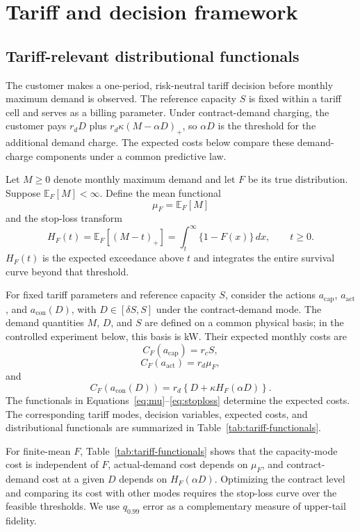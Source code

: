\documentclass[Times1COL]{WileyNJDv5}
\begin{document}
\section{Tariff and decision framework}
\label{sec:tariff-decision-framework}

\subsection{Tariff-relevant distributional functionals}
\label{sec:tariff-functionals}

The customer makes a one-period, risk-neutral tariff decision before monthly maximum demand is observed. The reference capacity $S$ is fixed within a tariff cell and serves as a billing parameter. Under contract-demand charging, the customer pays $r_dD$ plus $r_d\kappa(M-\alpha D)_+$, so $\alpha D$ is the threshold for the additional demand charge. The expected costs below compare these demand-charge components under a common predictive law.

Let $M\geq 0$ denote monthly maximum demand and let $F$ be its true distribution. Suppose $\mathbb{E}_F[M]<\infty$. Define the mean functional
\begin{equation}
\label{eq:mu}
\mu_F=\mathbb{E}_F[M]
\end{equation}
and the stop-loss transform
\begin{equation}
\label{eq:stoploss}
H_F(t)
=
\mathbb{E}_F[(M-t)_+]
=
\int_t^\infty \{1-F(x)\}\,dx,
\qquad t\geq0.
\end{equation}
$H_F(t)$ is the expected exceedance above $t$ and integrates the entire survival curve beyond that threshold.

For fixed tariff parameters and reference capacity $S$, consider the actions $a_{\mathrm{cap}}$, $a_{\mathrm{act}}$, and $a_{\mathrm{con}}(D)$, with $D\in[\delta S,S]$ under the contract-demand mode. The demand quantities $M$, $D$, and $S$ are defined on a common physical basis; in the controlled experiment below, this basis is kW. Their expected monthly costs are
\[
C_F(a_{\mathrm{cap}})=r_cS,
\]
\[
C_F(a_{\mathrm{act}})=r_d\mu_F,
\]
and
\[
C_F\!\left(a_{\mathrm{con}}(D)\right)
=
r_d\left\{D+\kappa H_F(\alpha D)\right\}.
\]
The functionals in Equations~\eqref{eq:mu}--\eqref{eq:stoploss} determine the expected costs. The corresponding tariff modes, decision variables, expected costs, and distributional functionals are summarized in Table~\ref{tab:tariff-functionals}.



For finite-mean $F$, Table~\ref{tab:tariff-functionals} shows that the
capacity-mode cost is independent of $F$, actual-demand cost depends on
$\mu_F$, and contract-demand cost at a given $D$ depends on
$H_F(\alpha D)$. Optimizing the contract level and comparing its cost with other modes
requires the stop-loss curve over the feasible thresholds. We use
$q_{0.99}$ error as a complementary measure of upper-tail fidelity.
\end{document}
